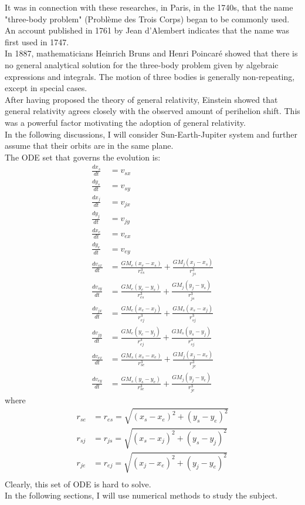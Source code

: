 \documentclass[10pt,a4paper]{article}
\begin{document}
	It was in connection with these researches, in Paris, in the 1740s, that the name "three-body problem" (Problème des Trois Corps) began to be commonly used. An account published in 1761 by Jean d'Alembert indicates that the name was first used in 1747.\\
	In 1887, mathematicians Heinrich Bruns and Henri Poincaré showed that there is no general analytical solution for the three-body problem given by algebraic expressions and integrals. The motion of three bodies is generally non-repeating, except in special cases.\\
	After having proposed the theory of general relativity, Einstein showed that general relativity agrees closely with the observed amount of perihelion shift. This was a powerful factor motivating the adoption of general relativity.\\
	In the following discussions, I will consider Sun-Earth-Jupiter system and further assume that their orbits are in the same plane.\\
	The ODE set that governs the evolution is:
	\begin{align}
	\frac{dx_s}{dt}&=v_{sx}\\
	\frac{dy_s}{dt}&=v_{sy}\\
	\frac{dx_j}{dt}&=v_{jx}\\
	\frac{dy_j}{dt}&=v_{jy}\\
	\frac{dx_e}{dt}&=v_{ex}\\
	\frac{dy_e}{dt}&=v_{ey}\\
	\frac{dv_{sx}}{dt}&=\frac{GM_e(x_e-x_s)}{r_{es}^3}+\frac{GM_j(x_j-x_s)}{r_{js}^3}\\
	\frac{dv_{sy}}{dt}&=\frac{GM_e(y_e-y_s)}{r_{es}^3}+\frac{GM_j(y_j-y_s)}{r_{js}^3}\\
	\frac{dv_{jx}}{dt}&=\frac{GM_e(x_e-x_j)}{r_{ej}^3}+\frac{GM_s(x_s-x_j)}{r_{sj}^3}\\
	\frac{dv_{jy}}{dt}&=\frac{GM_e(y_e-y_j)}{r_{ej}^3}+\frac{GM_s(y_s-y_j)}{r_{sj}^3}\\
	\frac{dv_{ex}}{dt}&=\frac{GM_s(x_s-x_e)}{r_{se}^3}+\frac{GM_j(x_j-x_e)}{r_{je}^3}\\
	\frac{dv_{ey}}{dt}&=\frac{GM_s(y_s-y_e)}{r_{se}^3}+\frac{GM_j(y_j-y_e)}{r_{je}^3}
	\end{align}
	where
	\begin{align}
	r_{se}&=r_{es}=\sqrt{(x_s-x_e)^2+(y_s-y_e)^2}\\
	r_{sj}&=r_{js}=\sqrt{(x_s-x_j)^2+(y_s-y_j)^2}\\
	r_{je}&=r_{ej}=\sqrt{(x_j-x_e)^2+(y_j-y_e)^2}\\
	\end{align}
	Clearly, this set of ODE is hard to solve.\\
	In the following sections, I will use numerical methods to study the subject.
	
\end{document}
